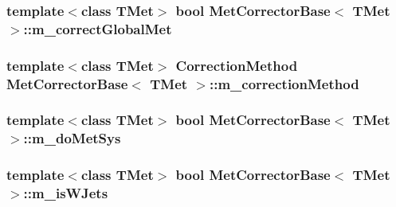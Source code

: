 \hypertarget{classMetCorrectorBase_a83e63d8cf10b1729d0b52bc400051ab3}{
\subsubsection[{m\_\-correctGlobalMet}]{\setlength{\rightskip}{0pt plus 5cm}template$<$class TMet$>$ bool {\bf MetCorrectorBase}$<$ TMet $>$::{\bf m\_\-correctGlobalMet}}}
\label{classMetCorrectorBase_a83e63d8cf10b1729d0b52bc400051ab3}
\hypertarget{classMetCorrectorBase_a645b5d5383e8faeaa831f1920e5b4665}{
\subsubsection[{m\_\-correctionMethod}]{\setlength{\rightskip}{0pt plus 5cm}template$<$class TMet$>$ {\bf CorrectionMethod} {\bf MetCorrectorBase}$<$ TMet $>$::{\bf m\_\-correctionMethod}}}
\label{classMetCorrectorBase_a645b5d5383e8faeaa831f1920e5b4665}
\hypertarget{classMetCorrectorBase_a198e2c6d4ab350166b2a3ef2da7fef07}{
\subsubsection[{m\_\-doMetSys}]{\setlength{\rightskip}{0pt plus 5cm}template$<$class TMet$>$ bool {\bf MetCorrectorBase}$<$ TMet $>$::{\bf m\_\-doMetSys}}}
\label{classMetCorrectorBase_a198e2c6d4ab350166b2a3ef2da7fef07}
\hypertarget{classMetCorrectorBase_af0c8f314b82074900251d273fbabba12}{
\subsubsection[{m\_\-isWJets}]{\setlength{\rightskip}{0pt plus 5cm}template$<$class TMet$>$ bool {\bf MetCorrectorBase}$<$ TMet $>$::{\bf m\_\-isWJets}}}
